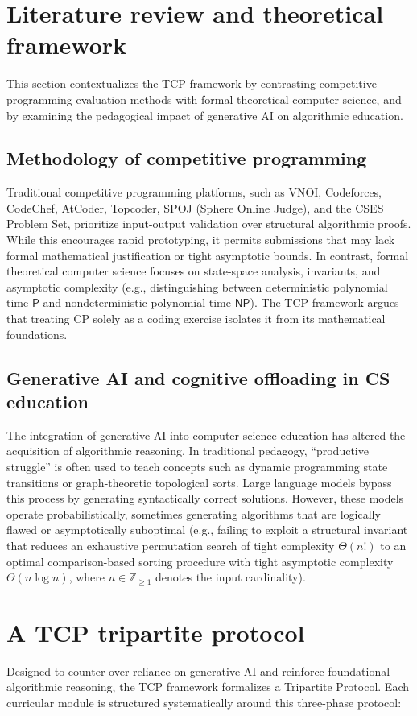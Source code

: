 \documentclass[10pt, letterpaper]{article}
\begin{document}
\section{Literature review and theoretical framework}
This section contextualizes the TCP framework by contrasting competitive programming evaluation methods with formal theoretical computer science, and by examining the pedagogical impact of generative AI on algorithmic education.

\subsection{Methodology of competitive programming}
Traditional competitive programming platforms, such as VNOI, Codeforces, CodeChef, AtCoder, Topcoder, SPOJ (Sphere Online Judge), and the CSES Problem Set, prioritize input-output validation over structural algorithmic proofs. While this encourages rapid prototyping, it permits submissions that may lack formal mathematical justification or tight asymptotic bounds. In contrast, formal theoretical computer science focuses on state-space analysis, invariants, and asymptotic complexity (e.g., distinguishing between deterministic polynomial time $\mathsf{P}$ and nondeterministic polynomial time $\mathsf{NP}$). The TCP framework argues that treating CP solely as a coding exercise isolates it from its mathematical foundations.

\subsection{Generative AI and cognitive offloading in CS education}
The integration of generative AI into computer science education has altered the acquisition of algorithmic reasoning. In traditional pedagogy, ``productive struggle'' is often used to teach concepts such as dynamic programming state transitions or graph-theoretic topological sorts. Large language models bypass this process by generating syntactically correct solutions. However, these models operate probabilistically, sometimes generating algorithms that are logically flawed or asymptotically suboptimal (e.g., failing to exploit a structural invariant that reduces an exhaustive permutation search of tight complexity $\Theta(n!)$ to an optimal comparison-based sorting procedure with tight asymptotic complexity $\Theta(n \log n)$, where $n \in \mathbb{Z}_{\ge 1}$ denotes the input cardinality).

\section{A TCP tripartite protocol}\label{sec:tripartite_protocol}
Designed to counter over-reliance on generative AI and reinforce foundational algorithmic reasoning, the TCP framework formalizes a Tripartite Protocol. Each curricular module is structured systematically around this three-phase protocol:
\end{document}
